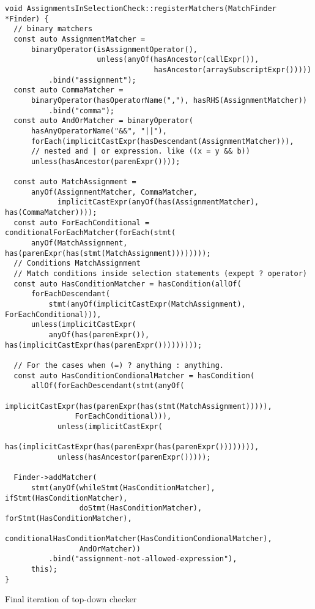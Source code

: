 \begin{code}
\begin{verbatim}
void AssignmentsInSelectionCheck::registerMatchers(MatchFinder *Finder) {
  // binary matchers
  const auto AssignmentMatcher =
      binaryOperator(isAssignmentOperator(),
                     unless(anyOf(hasAncestor(callExpr()),
                                  hasAncestor(arraySubscriptExpr()))))
          .bind("assignment");
  const auto CommaMatcher =
      binaryOperator(hasOperatorName(","), hasRHS(AssignmentMatcher))
          .bind("comma");
  const auto AndOrMatcher = binaryOperator(
      hasAnyOperatorName("&&", "||"),
      forEach(implicitCastExpr(hasDescendant(AssignmentMatcher))),
      // nested and | or expression. like ((x = y && b))
      unless(hasAncestor(parenExpr())));

  const auto MatchAssignment =
      anyOf(AssignmentMatcher, CommaMatcher,
            implicitCastExpr(anyOf(has(AssignmentMatcher), has(CommaMatcher))));
  const auto ForEachConditional = conditionalForEachMatcher(forEach(stmt(
      anyOf(MatchAssignment, has(parenExpr(has(stmt(MatchAssignment))))))));
  // Conditions MatchAssignment
  // Match conditions inside selection statements (expept ? operator)
  const auto HasConditionMatcher = hasCondition(allOf(
      forEachDescendant(
          stmt(anyOf(implicitCastExpr(MatchAssignment), ForEachConditional))),
      unless(implicitCastExpr(
          anyOf(has(parenExpr()), has(implicitCastExpr(has(parenExpr()))))))));

  // For the cases when (=) ? anything : anything.
  const auto HasConditionCondionalMatcher = hasCondition(
      allOf(forEachDescendant(stmt(anyOf(
                implicitCastExpr(has(parenExpr(has(stmt(MatchAssignment))))),
                ForEachConditional))),
            unless(implicitCastExpr(
                has(implicitCastExpr(has(parenExpr(has(parenExpr()))))))),
            unless(hasAncestor(parenExpr()))));

  Finder->addMatcher(
      stmt(anyOf(whileStmt(HasConditionMatcher), ifStmt(HasConditionMatcher),
                 doStmt(HasConditionMatcher), forStmt(HasConditionMatcher),
                 conditionalHasConditionMatcher(HasConditionCondionalMatcher),
                 AndOrMatcher))
          .bind("assignment-not-allowed-expression"),
      this);
}
\end{verbatim}
\caption{Final iteration of top-down checker}
\label{code:top-down-updated}
\end{code}

